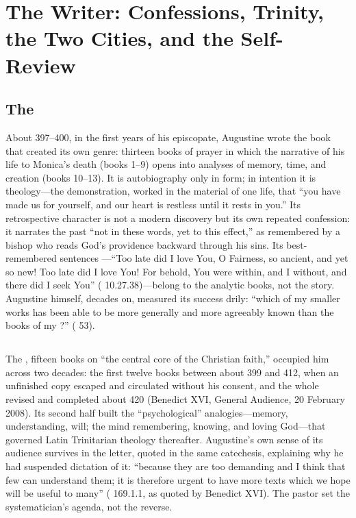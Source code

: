\section{The Writer: Confessions, Trinity, the Two Cities, and the Self-Review}

\subsection{The }

About 397--400, in the first years of his episcopate, Augustine wrote the
book that created its own genre: thirteen books of prayer in which the
narrative of his life to Monica's death (books 1--9) opens into analyses of
memory, time, and creation (books 10--13). It is autobiography only in
form; in intention it is theology---the demonstration, worked in the
material of one life, that ``you have made us for yourself, and our heart
is restless until it rests in you.'' Its retrospective character is not a
modern discovery but its own repeated confession: it narrates the past ``not
in these words, yet to this effect,'' as remembered by a bishop who reads
God's providence backward through his sins. Its best-remembered sentences
---``Too late did I love You, O Fairness, so ancient, and yet so new! Too
late did I love You! For behold, You were within, and I without, and there
did I seek You'' ( 10.27.38)---belong to the analytic
books, not the story. Augustine himself, decades on, measured its success
drily: ``which of my smaller works has been able to be more generally and
more agreeably known than the books of my ?'' ( 53).

\subsection{}

The , fifteen books on ``the central core of the
Christian faith,'' occupied him across two decades: the first twelve books
between about 399 and 412, when an unfinished copy escaped and circulated
without his consent, and the whole revised and completed about 420
(Benedict XVI, General Audience, 20 February 2008). Its second half built
the ``psychological'' analogies---memory, understanding, will; the mind
remembering, knowing, and loving God---that governed Latin Trinitarian
theology thereafter. Augustine's own sense of its audience survives in the
letter, quoted in the same catechesis, explaining why he had suspended
dictation of it: ``because they are too demanding and I think that few can
understand them; it is therefore urgent to have more texts which we hope
will be useful to many'' ( 169.1.1, as quoted by Benedict
XVI). The pastor set the systematician's agenda, not the reverse.

